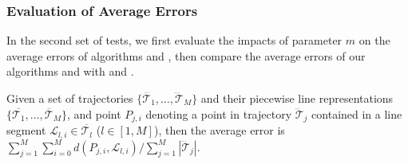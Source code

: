 \subsubsection{Evaluation of Average Errors}
In the second set of tests, we first evaluate the impacts of parameter $m$ on the average errors of algorithms \cist and \cista, then compare the average errors of our algorithms \cist and \cista with \dps and \squishe.

Given a set of trajectories $\{\dddot{\mathcal{T}_1}, \ldots, \dddot{\mathcal{T}}_M\}$ and their piecewise line representations $\{\overline{\mathcal{T}_1}, \ldots, \overline{\mathcal{T}}_M\}$, and point $P_{j,i}$ denoting
a point in trajectory $\dddot{\mathcal{T}}_j$ contained in a line segment $\mathcal{L}_{l,i}\in\overline{\mathcal{T}_l}$ ($l\in[1,M]$),
then the average error is $\sum_{j=1}^{M}\sum_{i=0}^{M} d(P_{j,i},
\mathcal{L}_{l,i})/\sum_{j=1}^{M}{|\dddot{\mathcal{T}}_j |}$.




